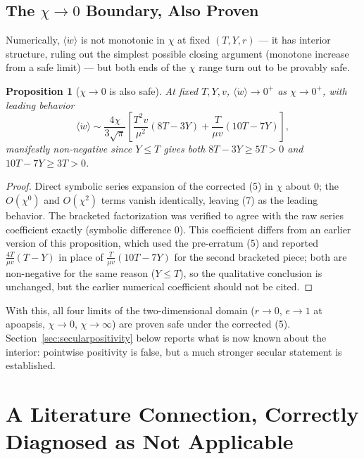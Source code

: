 \documentclass[12pt]{amsart}
\theoremstyle{plain}
\newtheorem{proposition}[theorem]{Proposition}
\theoremstyle{remark}
\begin{document}
\subsection{The $\chi\to0$ Boundary, Also Proven}

Numerically, $\langle\dot w\rangle$ is not monotonic in $\chi$ at fixed $(T,Y,r)$ --- it has interior structure, ruling out the simplest possible closing argument (monotone increase from a safe limit) --- but both ends of the $\chi$ range turn out to be provably safe.

\begin{proposition}[$\chi\to0$ is also safe]\label{prop:chi0}
At fixed $T,Y,v$, $\langle\dot w\rangle\to0^+$ as $\chi\to0^+$, with leading behavior
\begin{equation}
\langle\dot w\rangle \sim \frac{4\chi}{3\sqrt\pi}\left[\frac{T^2v}{\mu^2}(8T-3Y) + \frac{T}{\mu v}(10T-7Y)\right], \tag{7}
\end{equation}
manifestly non-negative since $Y\leq T$ gives both $8T-3Y\geq5T>0$ and $10T-7Y\geq3T>0$.
\end{proposition}

\begin{proof}
Direct symbolic series expansion of the corrected (5) in $\chi$ about $0$; the $O(\chi^0)$ and $O(\chi^2)$ terms vanish identically, leaving (7) as the leading behavior. The bracketed factorization was verified to agree with the raw series coefficient exactly (symbolic difference $0$). This coefficient differs from an earlier version of this proposition, which used the pre-erratum (5) and reported $\tfrac{4T}{\mu v}(T-Y)$ in place of $\tfrac{T}{\mu v}(10T-7Y)$ for the second bracketed piece; both are non-negative for the same reason ($Y\leq T$), so the qualitative conclusion is unchanged, but the earlier numerical coefficient should not be cited.
\end{proof}

With this, all four limits of the two-dimensional domain ($r\to0$, $e\to1$ at apoapsis, $\chi\to0$, $\chi\to\infty$) are proven safe under the corrected (5). Section~\ref{sec:secularpositivity} below reports what is now known about the interior: pointwise positivity is false, but a much stronger secular statement is established.

\section{A Literature Connection, Correctly Diagnosed as Not Applicable}
\end{document}
